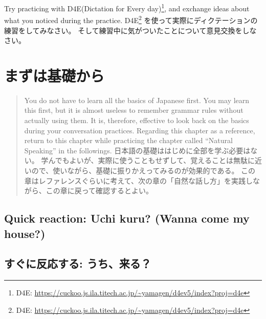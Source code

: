 \documentclass[uplatex,dvipdfmx,b5paper,english,10pt]{jsbook}
\newif\ifSTARTFROMTHEBASICS
\begin{document}
\begin{toiquestion}
\ifEnglish
Try practicing with D4E(Dictation for Every day)\footnote{D4E: \href{https://cuckoo.js.ila.titech.ac.jp/~yamagen/d4ev5/index?proj=d4e}{\url{https://cuckoo.js.ila.titech.ac.jp/~yamagen/d4ev5/index?proj=d4e}}}, and exchange ideas about what you noticed during the practice.
\else
D4E\footnote{D4E: \href{https://cuckoo.js.ila.titech.ac.jp/~yamagen/d4ev5/index?proj=d4e}{\url{https://cuckoo.js.ila.titech.ac.jp/~yamagen/d4ev5/index?proj=d4e}}}
を使って実際にディクテーションの練習をしてみなさい。
そして練習中に気がついたことについて意見交換をしなさい。
\fi
\end{toiquestion}
\fi%


\ifSTARTFROMTHEBASICS
\ifEnglish
\chapter{Start from the Basics}
\else
\chapter{まずは基礎から}
\fi%

\begin{abstract}
\ifEnglish
You do not have to learn all the basics of Japanese first.
You may learn this first, but it is almost useless to remember grammar rules without actually using them.
It is, therefore, effective to look back on the basics during your conversation practices.
Regarding this chapter as a reference, return to this chapter while practicing the chapter called ``Natural Speaking'' in the followings.
\else
日本語の基礎ははじめに全部を学ぶ必要はない。
学んでもよいが、実際に使うこともせずして、覚えることは無駄に近いので、使いながら、基礎に振りかえってみるのが効果的である。
この章はレファレンスぐらいに考えて、次の章の「自然な話し方」を実践しながら、この章に戻って確認するとよい。
\fi
\end{abstract}


\ifEnglish
\section{Quick reaction: Uchi kuru? (Wanna come my house?)}
\else
\section{すぐに反応する: うち、来る？}
\fi
\end{document}
